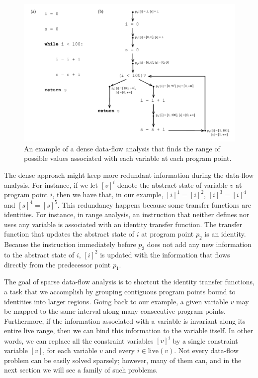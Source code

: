\begin{figure}[t!]
\centering
\includegraphics[width=\linewidth]{ProgramPoint}
\caption{An example of a dense data-flow analysis that finds the range of
possible values associated with each variable at each program point.}
\label{fig:aliasAnalysis}
\end{figure}

The dense approach might keep more redundant information during the
data-flow analysis.
For instance, if we let $[v]^i$ denote the abstract state of variable
$v$ at program point $i$, then we have that, in our example, $[i]^1 = [i]^2$,
$[i]^3 = [i]^4$ and $[s]^4 = [s]^5$.
This redundancy happens because some transfer functions are identities.
For instance, in range analysis, an instruction that neither defines nor uses any variable is associated with an identity transfer function.
The transfer function that updates the abstract state of $i$ at program point $p_2$ is an identity.
Because the instruction immediately before $p_2$ does not add any new information to the abstract state of $i$, $[i]^2$ is updated with the information that flows directly from the predecessor point $p_1$.

The goal of sparse data-flow analysis is to shortcut the identity transfer functions, a task that we accomplish by grouping contiguous program points bound to identities into larger regions.
Going back to our example, a given variable $v$ may be mapped to the same interval along many consecutive program points.
Furthermore, if the information associated with a variable is invariant along its
entire live range, then we can bind this information to the variable itself.
In other words, we can replace all the constraint variables
$[v]^i$ by a single constraint variable $[v]$, for each variable $v$
and every $i\in \textrm{live}(v)$.
Not every data-flow problem can be easily solved sparsely; however, many of them can, and in the next section we will see a family of such problems.

